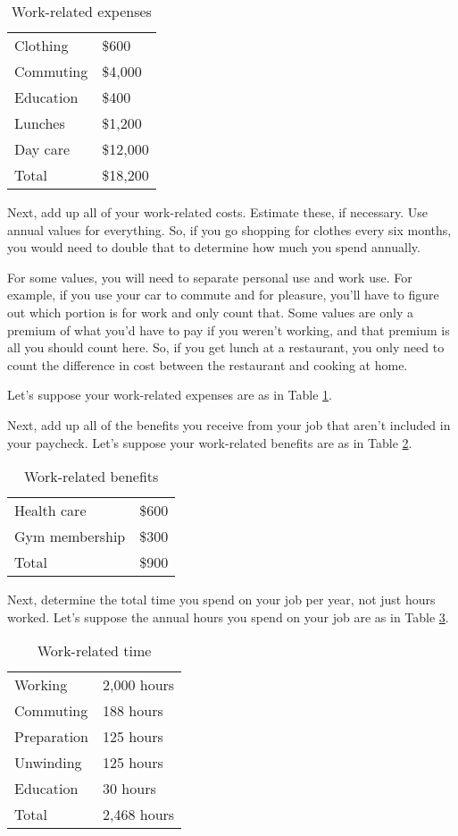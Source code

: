 \begin{table}[ht]
\caption{Work-related expenses}
\label{table:expenses}
\centering
\begin{tabular}{l l}
\hline\hline
Clothing & \$600 \\
Commuting & \$4,000 \\
Education & \$400 \\
Lunches & \$1,200 \\
Day care & \$12,000 \\
\hline
Total & \$18,200 \\
\end{tabular}
\end{table}

Next, add up all of your work-related costs. Estimate these, if necessary. Use annual values for everything. So, if you go shopping for clothes every six months, you would need to double that to determine how much you spend annually.

For some values, you will need to separate personal use and work use. For example, if you use your car to commute and for pleasure, you'll have to figure out which portion is for work and only count that. Some values are only a premium of what you'd have to pay if you weren't working, and that premium is all you should count here. So, if you get lunch at a restaurant, you only need to count the difference in cost between the restaurant and cooking at home.

Let's suppose your work-related expenses are as in Table \ref{table:expenses}.

Next, add up all of the benefits you receive from your job that aren't included in your paycheck. Let's suppose your work-related benefits are as in Table \ref{table:benefits}.

\begin{table}[ht]
\caption{Work-related benefits}
\label{table:benefits}
\centering
\begin{tabular}{l l}
\hline\hline
Health care & \$600 \\
Gym membership & \$300 \\
\hline
Total & \$900 \\
\end{tabular}
\end{table}

Next, determine the total time you spend on your job per year, not just hours worked. Let's suppose the annual hours you spend on your job are as in Table \ref{table:time}.

\begin{table}[ht]
\caption{Work-related time}
\label{table:time}
\centering
\begin{tabular}{l l}
\hline\hline
Working & 2,000 hours \\
Commuting & 188 hours \\
Preparation & 125 hours \\
Unwinding & 125 hours \\
Education & 30 hours \\
\hline
Total & 2,468 hours \\
\end{tabular}
\end{table}

